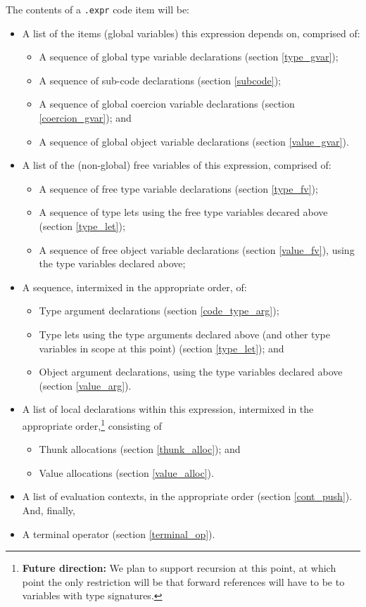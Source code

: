 \documentclass{report}
\newcommand\stringcode[1]{\texttt{#1}}
\newcommand\future[1]{\footnote{\textbf{Future direction:} #1}}
\begin{document}
The contents of a \stringcode{.expr} code item will be:
\begin{itemize}
    \item A list of the items (global variables) this expression depends on, comprised of:
        \begin{itemize}
            \item A sequence of global type variable declarations (section \ref{type_gvar});
            \item A sequence of sub-code declarations (section \ref{subcode});
            \item A sequence of global coercion variable declarations (section \ref{coercion_gvar}); and
            \item A sequence of global object variable declarations (section \ref{value_gvar}).
        \end{itemize}
    \item A list of the (non-global) free variables of this expression, comprised of:
        \begin{itemize}
            \item A sequence of free type variable declarations (section \ref{type_fv});
            \item A sequence of type lets using the free type variables decared above (section \ref{type_let});
            \item A sequence of free object variable declarations (section \ref{value_fv}), using the type variables declared above;
        \end{itemize}
    \item A sequence, intermixed in the appropriate order, of:
        \begin{itemize}
            \item Type argument declarations (section \ref{code_type_arg});
            \item Type lets using the type arguments declared above (and other type variables in scope at this point) (section \ref{type_let}); and
            \item Object argument declarations, using the type variables declared above (section \ref{value_arg}).
        \end{itemize}
    \item A list of local declarations within this expression,
        intermixed in the appropriate order,\future{We plan to support recursion at this point, at which point the only restriction will be that forward references will have to be to variables with type signatures.}
        consisting of
        \begin{itemize}
            \item Thunk allocations (section \ref{thunk_alloc}); and
            \item Value allocations (section \ref{value_alloc}).
        \end{itemize}
    \item A list of evaluation contexts, in the appropriate order (section \ref{cont_push}).
        And, finally,
    \item A terminal operator (section \ref{terminal_op}).
\end{itemize}
\end{document}
